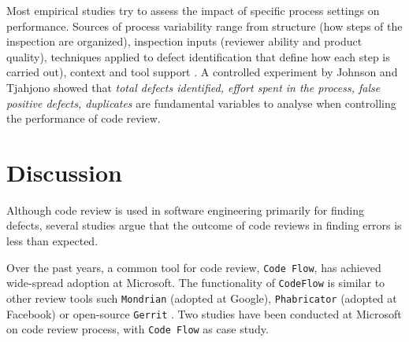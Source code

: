\documentclass[ifip]{svmult}
\begin{document}
Most empirical studies try to assess the impact of specific process settings on performance.
Sources of process variability range from structure (how steps of the inspection 
are organized), inspection inputs (reviewer ability and product quality), 
techniques applied to defect identification that define how each step is carried out), 
context and tool support \cite{contribution16}.  
A controlled experiment by Johnson and Tjahjono \cite{contribution17} showed that \textit{total defects identified, effort spent in the 
process, false positive defects, duplicates} are fundamental variables to analyse when controlling the performance of code review. 

\section{Discussion}
\label{sec:2}


Although code review is used in software engineering primarily for finding defects, several studies argue that 
the outcome of code reviews in finding errors is less than expected.

Over the past years, a common tool for code review, \texttt{Code Flow}, has achieved wide-spread adoption at Microsoft. 
The functionality of \texttt{CodeFlow} is similar to other review tools such \texttt{Mondrian} \cite{contribution6} 
(adopted at Google), \texttt{Phabricator} 
\cite{contribution7} (adopted at Facebook) or open-source \texttt{Gerrit} \cite{contribution8}.
Two studies have been conducted at Microsoft on code review process, with \texttt{Code Flow} as case study.
\end{document}
